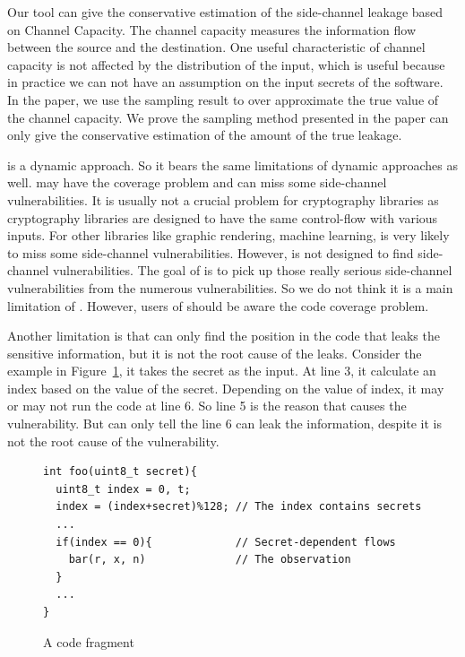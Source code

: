 Our tool can give the conservative estimation of the side-channel leakage based on Channel Capacity. The channel capacity measures  the information flow between the source and the destination. One useful characteristic of channel capacity is not affected by the distribution of the input, which is useful because in practice we can not have an assumption on the input secrets of the software. In the paper, we use the sampling result to over approximate the true value of the channel capacity. We prove the sampling method presented in the paper can only give the conservative estimation of the amount of the true leakage.

\tool{} is a dynamic approach. So it bears the same limitations of dynamic approaches as well. \tool{} may have the coverage problem and can miss some side-channel vulnerabilities. It is usually not a crucial problem for cryptography libraries as cryptography libraries are designed to have the same control-flow with various inputs. For other libraries like graphic rendering, machine learning, \tool{} is very likely to miss some side-channel vulnerabilities. However, \tool{} is not designed to find side-channel vulnerabilities. The goal of \tool{} is to pick up those really serious side-channel vulnerabilities from the numerous vulnerabilities. So we do not think it is a main limitation of \tool{}. However, users of \tool{} should be aware the code coverage problem.

Another limitation is that \tool{} can only find the position in the code that leaks the sensitive information, but it is not the root cause of the leaks. Consider the example in Figure~\ref{fig:limitation}, it takes the secret as the input. At line 3, it calculate an index based on the value of the secret. Depending on the value of index, it may or may not run the code at line 6. So line 5 is the reason that causes the vulnerability. But \tool{} can only tell the line 6 can leak the information, despite it is not the root cause of the vulnerability.

\begin{figure}
  \centering
  \begin{lstlisting}[xleftmargin=.02\textwidth,xrightmargin=.01\textwidth]
int foo(uint8_t secret){
  uint8_t index = 0, t;
  index = (index+secret)%128; // The index contains secrets
  ...
  if(index == 0){             // Secret-dependent flows
    bar(r, x, n)              // The observation
  }
  ...
}
\end{lstlisting}
  \caption{A code fragment}
  \label{fig:limitation}
\end{figure}
